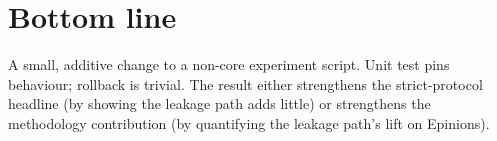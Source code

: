 \documentclass[11pt,a4paper]{article}
\begin{document}
\section{Bottom line}

A small, additive change to a non-core experiment script.
Unit test pins behaviour; rollback is trivial. The result either
strengthens the strict-protocol headline (by showing the leakage
path adds little) or strengthens the methodology contribution (by
quantifying the leakage path's lift on Epinions).
\end{document}
